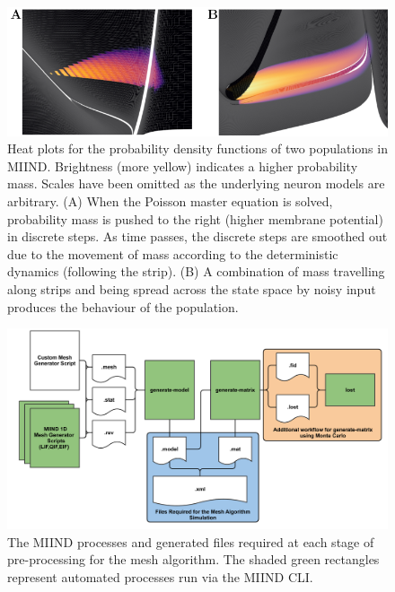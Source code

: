 \documentclass[utf8]{frontiersSCNS} %
\begin{document}
\begin{figure}[tb!]
  \centering
    \includegraphics[width=\linewidth]{images/density_full_figure.pdf}
  \caption{Heat plots for the probability density functions of two populations in MIIND. Brightness (more yellow) indicates a higher probability mass. Scales have been omitted as the underlying neuron models are arbitrary. (A) When the Poisson master equation is solved, probability mass is pushed to the right (higher membrane potential) in discrete steps. As time passes, the discrete steps are smoothed out due to the movement of mass according to the deterministic dynamics (following the strip). (B) A combination of mass travelling along strips and being spread across the state space by noisy input produces the behaviour of the population.}
  \label{fig:desities}
\end{figure}

\begin{figure}[!htb]
\centering
    \includegraphics[width=\linewidth]{images/mesh_workflow.pdf}
  \caption{The MIIND processes and generated files required at each stage of pre-processing for the mesh algorithm. The shaded green rectangles represent automated processes run via the MIIND CLI.}
  \label{fig:meshworkflow}
\end{figure}
\end{document}
